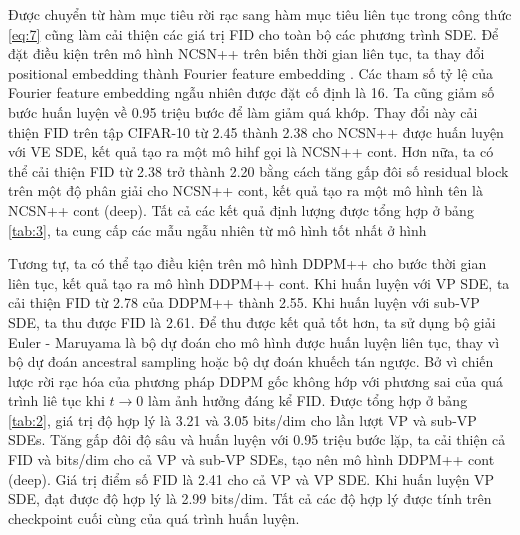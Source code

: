 \documentclass{article} %
\begin{document}
Được chuyển từ hàm mục tiêu rời rạc sang hàm mục tiêu liên tục trong công thức \ref{eq:7} cũng làm cải thiện các giá trị FID cho toàn bộ các phương trình SDE.
Để đặt điều kiện trên mô hình NCSN++ trên biến thời gian liên tục, ta thay đổi positional embedding thành Fourier feature embedding \citep{tancik2020fourier}.
Các tham số tỷ lệ của Fourier feature embedding ngẫu nhiên được đặt cố định là 16.
Ta cũng giảm số bước huấn luyện về 0.95 triệu bước để làm giảm quá khớp.
Thay đổi này cải thiện FID trên tập CIFAR-10 từ 2.45 thành 2.38 cho NCSN++ được huấn luyện với VE SDE, kết quả tạo ra một mô hihf gọi là NCSN++ cont.
Hơn nữa, ta có thể cải thiện FID từ 2.38 trở thành 2.20 bằng cách tăng gấp đôi số residual block trên một độ phân giải cho NCSN++ cont, kết quả tạo ra một mô hình tên là NCSN++ cont (deep).
Tất cả các kết quả định lượng được tổng hợp ở bảng \ref{tab:3}, ta cung cấp các mẫu ngẫu nhiên từ mô hình tốt nhất ở hình 


Tương tự, ta có thể tạo điều kiện trên mô hình DDPM++ cho bước thời gian liên tục, kết quả tạo ra mô hình DDPM++ cont.
Khi huấn luyện với VP SDE, ta cải thiện FID từ 2.78 của DDPM++ thành 2.55.
Khi huấn luyện với sub-VP SDE, ta thu được FID là 2.61.
Để thu được kết quả tốt hơn, ta sử dụng bộ giải Euler - Maruyama là bộ dự đoán cho mô hình được huấn luyện liên tục, thay vì bộ dự đoán ancestral sampling hoặc bộ dự đoán khuếch tán ngược.
Bở vì chiến lược rời rạc hóa của phương pháp DDPM gốc không hớp với phương sai của quá trình liê tục khi $t \rightarrow 0$ làm ảnh hưởng đáng kể FID.
Được tổng hợp ở bảng \ref{tab:2}, giá trị độ hợp lý là 3.21 và 3.05 bits/dim cho lần lượt VP và sub-VP SDEs.
Tăng gấp đôi độ sâu và huấn luyện với 0.95 triệu bước lặp, ta cải thiện cả FID và bits/dim cho cả VP và sub-VP SDEs, tạo nên mô hình DDPM++ cont (deep).
Giá trị điểm số FID là 2.41 cho cả VP và VP SDE.
Khi huấn luyện VP SDE, đạt được độ hợp lý là 2.99 bits/dim.
Tất cả các độ hợp lý được tính trên checkpoint cuối cùng của quá trình huấn luyện.
\end{document}
